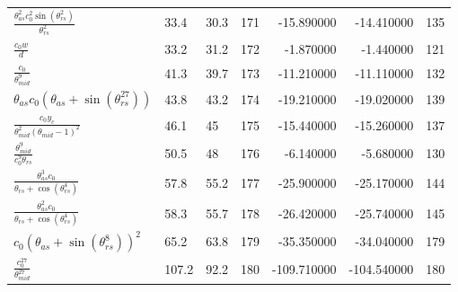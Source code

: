 \begin{tabularx}{\textwidth}{lllrrrr}
$ \displaystyle\frac{\theta_{as}^{2} c_{0}^{2} \sin{\left(\theta_{rs}^{2} \right)}}{\theta_{rs}^{2}} $  &  33.4  &  30.3  &  171  &  -15.890000  &  -14.410000  &  135  \\ 
$ \displaystyle\frac{c_{0} w}{d} $  &  33.2  &  31.2  &  172  &  -1.870000  &  -1.440000  &  121  \\ 
$ \displaystyle\frac{c_{0}}{\theta_{mid}^{9}} $  &  41.3  &  39.7  &  173  &  -11.210000  &  -11.110000  &  132  \\ 
$ \theta_{as} c_{0} \left(\theta_{as} + \sin{\left(\theta_{rs}^{27} \right)}\right) $  &  43.8  &  43.2  &  174  &  -19.210000  &  -19.020000  &  139  \\ 
$ \displaystyle\frac{c_{0} y_c}{\theta_{mid}^{2} \left(\theta_{mid} - 1\right)^{2}} $  &  46.1  &  45\phantom{.0}  &  175  &  -15.440000  &  -15.260000  &  137  \\ 
$ \displaystyle\frac{\theta_{mid}^{9}}{c_{0}^{9} \theta_{rs}} $  &  50.5  &  48\phantom{.0}  &  176  &  -6.140000  &  -5.680000  &  130  \\ 
$ \displaystyle\frac{\theta_{as}^{3} c_{0}}{\theta_{rs} + \cos{\left(\theta_{rs}^{4} \right)}} $  &  57.8  &  55.2  &  177  &  -25.900000  &  -25.170000  &  144  \\ 
$ \displaystyle\frac{\theta_{as}^{2} c_{0}}{\theta_{rs} + \cos{\left(\theta_{rs}^{4} \right)}} $  &  58.3  &  55.7  &  178  &  -26.420000  &  -25.740000  &  145  \\ 
$ c_{0} \left(\theta_{as} + \sin{\left(\theta_{rs}^{8} \right)}\right)^{2} $  &  65.2  &  63.8  &  179  &  -35.350000  &  -34.040000  &  179  \\ 
$ \displaystyle\frac{c_{0}^{27}}{\theta_{mid}^{27}} $  &  107.2  &  92.2  &  180  &  -109.710000  &  -104.540000  &  180  \\ 
\bottomrule
\end{tabularx}
